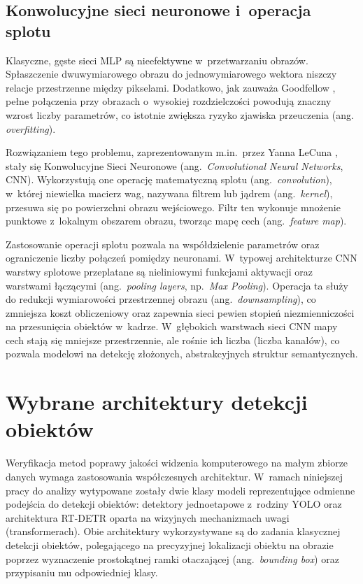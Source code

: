 \subsection{Konwolucyjne sieci neuronowe i~operacja splotu}

Klasyczne, gęste sieci MLP są nieefektywne w~przetwarzaniu obrazów. Spłaszczenie dwuwymiarowego obrazu do jednowymiarowego wektora niszczy relacje przestrzenne między pikselami. Dodatkowo, jak zauważa Goodfellow \cite{Goodfellow2016}, pełne połączenia przy obrazach o~wysokiej rozdzielczości powodują znaczny wzrost liczby parametrów, co istotnie zwiększa ryzyko zjawiska przeuczenia (ang. \emph{overfitting}).

Rozwiązaniem tego problemu, zaprezentowanym m.in.\ przez Yanna LeCuna \cite{LeCun1998}, stały się Konwolucyjne Sieci Neuronowe (ang.\ \emph{Convolutional Neural Networks}, CNN). Wykorzystują one operację matematyczną splotu (ang.\ \emph{convolution}), w~której niewielka macierz wag, nazywana filtrem lub jądrem (ang.\ \emph{kernel}), przesuwa się po powierzchni obrazu wejściowego. Filtr ten wykonuje mnożenie punktowe z~lokalnym obszarem obrazu, tworząc mapę cech (ang.\ \emph{feature map}).

Zastosowanie operacji splotu pozwala na współdzielenie parametrów oraz ograniczenie liczby połączeń pomiędzy neuronami. W~typowej architekturze CNN warstwy splotowe przeplatane są nieliniowymi funkcjami aktywacji oraz warstwami łączącymi (ang.\ \emph{pooling layers}, np.\ \emph{Max Pooling}). Operacja ta służy do redukcji wymiarowości przestrzennej obrazu (ang.\ \emph{downsampling}), co zmniejsza koszt obliczeniowy oraz zapewnia sieci pewien stopień niezmienniczości na przesunięcia obiektów w~kadrze. W~głębokich warstwach sieci CNN mapy cech stają się mniejsze przestrzennie, ale rośnie ich liczba (liczba kanałów), co pozwala modelowi na detekcję złożonych, abstrakcyjnych struktur semantycznych.


\section{Wybrane architektury detekcji obiektów}

Weryfikacja metod poprawy jakości widzenia komputerowego na małym zbiorze danych wymaga zastosowania współczesnych architektur. W~ramach niniejszej pracy do analizy wytypowane zostały dwie klasy modeli reprezentujące odmienne podejścia do detekcji obiektów: detektory jednoetapowe z~rodziny YOLO oraz architektura RT-DETR oparta na wizyjnych mechanizmach uwagi (transformerach). Obie architektury wykorzystywane są do zadania klasycznej detekcji obiektów, polegającego na precyzyjnej lokalizacji obiektu na obrazie poprzez wyznaczenie prostokątnej ramki otaczającej (ang.\ \emph{bounding box}) oraz przypisaniu mu odpowiedniej klasy.

